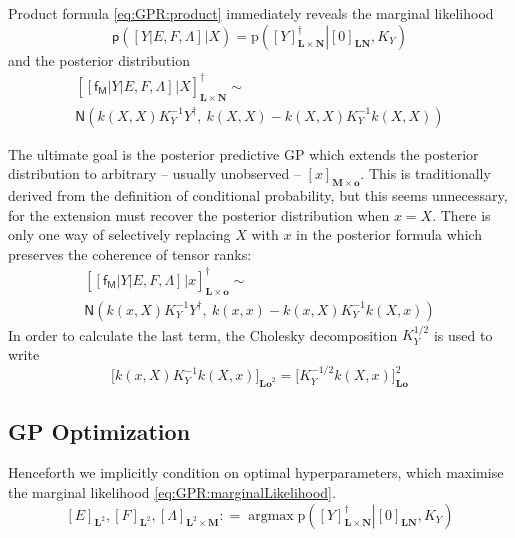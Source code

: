 \documentclass[preprint,12pt]{elsarticle}
\newcommand*{\M}[1]{\ensuremath{#1}\xspace}
\newcommand*{\x}{\times}
\newcommand*{\mi}[1]{\mathbf{#1}}
\newcommand*{\rv}[1]{\mathsf{#1}}
\newcommand*{\te}[2][]{\left\lbrack{#2}\right\rbrack_{#1}}
\newcommand*{\tte}[2][]{\lbrack{#2}\rbrack_{#1}}
\newcommand*{\prob}[3]{\M{\mathrm{p}\!\left(\left.{#1}\right\vert{#2,#3}\right)}}
\newcommand*{\deq}{\M{\mathrel{\mathop:}=}}
\newcommand*{\gauss}[2]{\mathsf{N}\!\left({#1,#2}\right)}
\DeclareMathOperator*{\argmax}{argmax}
\begin{document}
        Product formula \cref{eq:GPR:product} immediately reveals the marginal likelihood
        \begin{equation} \label{eq:GPR:marginalLikelihood}
            \mathsf{p}\!\left(\te{Y \vert E,F,\Lambda} \big\vert X\right)
            = \prob{\te[\mi{L\x N}]{Y}^{\dagger}}{\te[\mi{LN}]{0}}{K_Y}
        \end{equation}
        and the posterior distribution
        \begin{multline*}
            \te[\mi{L\x N}]{\te{\rv{f_M} \vert Y \vert E,F,\Lambda} \big\vert X}^{\dagger} \sim \\
            \gauss{k(X,X) K_{Y}^{-1} Y^{\dagger}}{\ k(X,X) - k(X,X) K_{Y}^{-1} k(X,X)}
        \end{multline*}

        The ultimate goal is the posterior predictive GP which extends the posterior distribution to arbitrary -- usually unobserved -- $\te[\mi{M}\x\mi{o}]{x}$. This is traditionally derived from the definition of conditional probability, but this seems unnecessary, for the extension must recover the posterior distribution when $x=X$. There is only one way of selectively replacing $X$ with $x$ in the posterior formula which preserves the coherence of tensor ranks:
        \begin{multline} \label{def:GPR:Predictive}
            \te[\mi{L\x o}]{\te{\rv{f_M} \vert Y \vert E,F,\Lambda} \big\vert x}^{\dagger} \sim \\
            \gauss{k(x,X) K_{Y}^{-1} Y^{\dagger}}{\ k(x,x) - k(x,X) K_{Y}^{-1} k(X,x)}
        \end{multline}
        In order to calculate the last term, the Cholesky decomposition $K_{Y}^{1/2}$ is used to write
        \begin{equation*}
            \tte[\mi{Lo}^{2}]{k(x,X) K_{Y}^{-1} k(X,x)} = \tte[\mi{Lo}]{K_{Y}^{-1/2} k(X,x)}^{2}
        \end{equation*}

    \subsection{GP Optimization} \label{sub:GPR:Optimization}
        Henceforth we implicitly condition on optimal hyperparameters, which maximise the marginal likelihood \cref{eq:GPR:marginalLikelihood}.
        \begin{equation} \label{eq:GPR:hyperparameters}
            \te[\mi{L}^{2}]{E},\te[\mi{L}^{2}]{F},\te[\mi{L}^{2}\x\mi{M}]{\Lambda} \deq \argmax \prob{\te[\mi{L\x N}]{Y}^{\dagger}}{\te[\mi{LN}]{0}}{K_Y}
        \end{equation}
\end{document}
